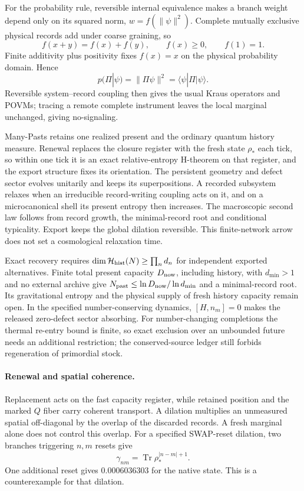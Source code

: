 \documentclass[11pt]{article}
\begin{document}
For the probability rule, reversible internal equivalence makes a branch weight depend only on its squared norm, $w=f(\|\psi\|^2)$. Complete mutually exclusive physical records add under coarse graining, so
\[
f(x+y)=f(x)+f(y),
\qquad f(x)\ge0,
\qquad f(1)=1.
\]
Finite additivity plus positivity fixes $f(x)=x$ on the physical probability domain. Hence
\[
\boxed{p(\Pi|\psi)=\|\Pi\psi\|^2=\langle\psi|\Pi|\psi\rangle}.
\]
Reversible system--record coupling then gives the usual Kraus operators and POVMs; tracing a remote complete instrument leaves the local marginal unchanged, giving no-signaling.

Many-Pasts retains one realized present and the ordinary quantum history measure. Renewal replaces the closure register with the fresh state $\rho_*$ each tick, so within one tick it is an exact relative-entropy H-theorem on that register, and the export structure fixes its orientation. The persistent geometry and defect sector evolves unitarily and keeps its superpositions. A recorded subsystem relaxes when an irreducible record-writing coupling acts on it, and on a microcanonical shell its present entropy then increases. The macroscopic second law follows from record growth, the minimal-record root and conditional typicality. Export keeps the global dilation reversible. This finite-network arrow does not set a cosmological relaxation time.

Exact recovery requires $\dim\mathcal H_{\rm hist}(N)\ge\prod_n d_n$ for independent exported alternatives. Finite total present capacity $D_{\rm now}$, including history, with $d_{\min}>1$ and no external archive give $N_{\rm past}\le\ln D_{\rm now}/\ln d_{\min}$ and a minimal-record root. Its gravitational entropy and the physical supply of fresh history capacity remain open. In the specified number-conserving dynamics, $[H,n_m]=0$ makes the released zero-defect sector absorbing. For number-changing completions the thermal re-entry bound is finite, so exact exclusion over an unbounded future needs an additional restriction; the conserved-source ledger still forbids regeneration of primordial stock.

\paragraph{Renewal and spatial coherence.}
Replacement acts on the fast capacity register, while retained
position and the marked \(Q\) fiber carry coherent transport.
A dilation multiplies an unmeasured spatial off-diagonal by
the overlap of the discarded records. A fresh marginal alone
does not control this overlap.
For a specified SWAP-reset dilation, two branches triggering
\(n,m\) resets give
\[
\gamma_{nm}=\operatorname{Tr}\rho_*^{|n-m|+1}.
\]
One additional reset gives \(0.0006036303\) for the native
state. This is a counterexample for that dilation.
\end{document}
